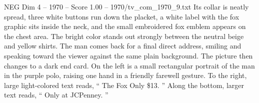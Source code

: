 \begin{textsample}{NEG Dim 4 – 1970 – Score 1.00 – 1970/tv\_com\_1970\_9.txt}
Its collar is neatly spread, three white buttons run down the placket, a white label with the fox graphic sits inside the neck, and the small embroidered fox emblem appears on the chest area.
The bright color stands out strongly between the neutral beige and yellow shirts.
The man comes back for a final direct address, smiling and speaking toward the viewer against the same plain background.
The picture then changes to a dark end card.
On the left is a small rectangular portrait of the man in the purple polo, raising one hand in a friendly farewell gesture.
To the right, large light-colored text reads, “ The Fox Only \$13. ” Along the bottom, larger text reads, “ Only at JCPenney. ”

\end{textsample}
